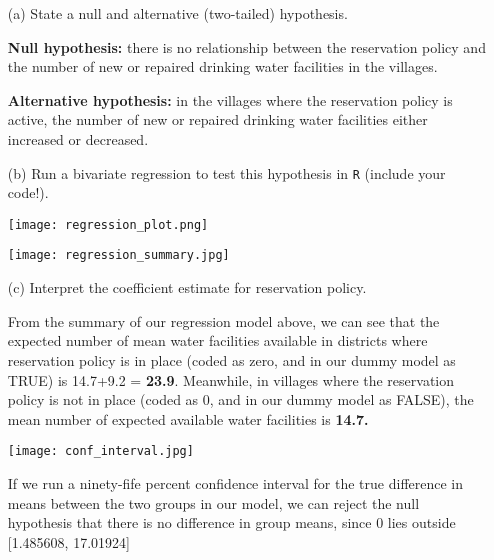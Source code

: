 \documentclass[12pt,letterpaper]{article}
\begin{document}
\newpage
\begin{enumerate}
	\item [(a)] State a null and alternative (two-tailed) hypothesis. 
	\vspace{1cm}
	
	\textbf{Null hypothesis:} there is no relationship between the reservation policy and the number of new or repaired drinking water facilities in the villages. 
	
	\textbf{Alternative hypothesis: }in the villages where the reservation policy is active, the number of new or repaired drinking water facilities either increased or decreased. 
	
	
	
	
	
	\vspace{0.5cm}
	\item [(b)] Run a bivariate regression to test this hypothesis in \texttt{R} (include your code!).
	\vspace{0.1cm}
	
	
	\texttt{[image: regression\_plot.png]}
	\vspace{2cm}
	 
	
\vspace{0.2cm}
	\texttt{[image: regression\_summary.jpg]}
	\vspace{2cm}
	\item [(c)] Interpret the coefficient estimate for reservation policy. 
	
	\vspace{0.6cm}
	
	From the summary of our regression model above, we can see that the expected number of mean water facilities available in districts where reservation policy is in place (coded as zero, and in our dummy model as TRUE) is 14.7+9.2 = \textbf{23.9}. Meanwhile, in villages where the reservation policy is not in place (coded as 0, and in our dummy model as FALSE), the mean number of expected available water facilities is \textbf{14.7.} 
	
		\texttt{[image: conf\_interval.jpg]}
		
		If we run a ninety-fife percent confidence interval for the true difference in 
means between the two groups in our model, we can reject the
null hypothesis that there is no difference in group means, since 0 lies outside [1.485608, 17.01924]
	
\end{enumerate}
\end{document}
